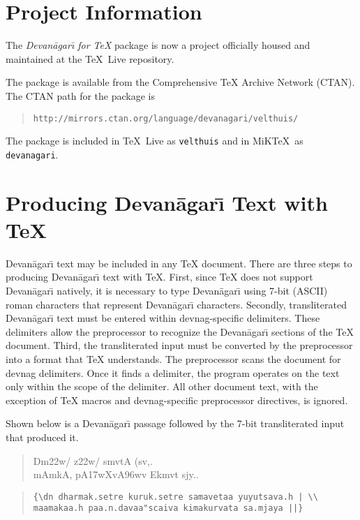 \documentclass[10pt]{article}
\newcommand{\devnag}{Devan\=agar{\=\i}}
\begin{document}
\section{Project Information}

The \textit{\devnag{} for \TeX{}} package is now a project
officially housed and maintained at the \TeX\ Live repository.

The package is available
from the Comprehensive \TeX{} Archive Network (CTAN). The CTAN path
for the package is

\begin{quote}
\texttt{http://mirrors.ctan.org/language/devanagari/velthuis/}
\end{quote}

The package is included in \TeX\ Live as \texttt{velthuis} and in MiK\TeX\ as \texttt{devanagari}.


\section{Producing \devnag{} Text with \TeX{}}

\devnag{} text may be included in any \TeX{} document. There are three steps
to producing \devnag{} text with \TeX{}. First, since \TeX{} does
not support \devnag{} natively, it is necessary to type \devnag{} using
\hbox{7-bit} (ASCII) roman characters that represent \devnag{} characters.
Secondly, transliterated \devnag{} text must be entered within
\textsf{devnag}-specific delimiters. These delimiters allow the preprocessor
to recognize the \devnag{} sections of the \TeX{} document. Third, the
transliterated input must be converted by the preprocessor into a format
that \TeX{} understands. The preprocessor scans the document for
\textsf{devnag} delimiters. Once it finds a delimiter, the program operates
on the text only within the scope of the delimiter. All other document text,
with the exception of \TeX{} macros and \textsf{devnag}-specific preprocessor
directives, is ignored.

Shown below is a \devnag{} passage followed by the 7-bit transliterated
input that produced it.

\begin{quote}
{\dn Dm\0\322w\?/\? z\322w\?/\? smv\?tA (sv,.\\
mAmkA, pA\317wXvA\396w\4v Ekmv\0t s\2jy..\par}
\end{quote}

\begin{quote}
\begin{verbatim}
{\dn dharmak.setre kuruk.setre samavetaa yuyutsava.h | \\
maamakaa.h paa.n.davaa"scaiva kimakurvata sa.mjaya ||}
\end{verbatim}
\end{quote}
\end{document}
